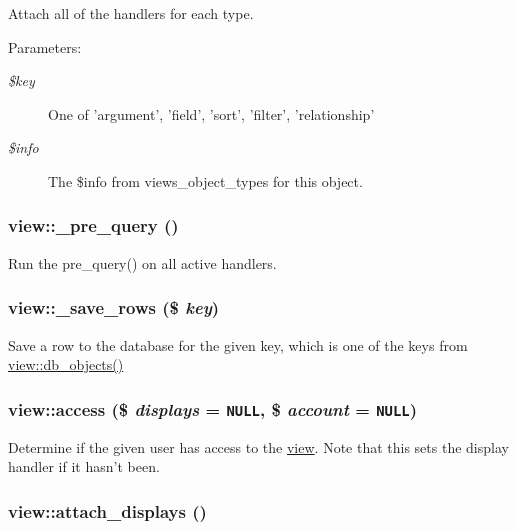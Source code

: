 Attach all of the handlers for each type.

\begin{Desc}
\item[Parameters:]
\begin{description}
\item[{\em \$key}]One of 'argument', 'field', 'sort', 'filter', 'relationship' \item[{\em \$info}]The \$info from views\_\-object\_\-types for this object. \end{description}
\end{Desc}
\hypertarget{classview_882fc1813823b4fa361748edaae121ee}{
\subsubsection[{\_\-pre\_\-query}]{\setlength{\rightskip}{0pt plus 5cm}view::\_\-pre\_\-query ()}}
\label{classview_882fc1813823b4fa361748edaae121ee}


Run the pre\_\-query() on all active handlers. \hypertarget{classview_c54578fd717de9be8c127add6e869bc2}{
\subsubsection[{\_\-save\_\-rows}]{\setlength{\rightskip}{0pt plus 5cm}view::\_\-save\_\-rows (\$ {\em key})}}
\label{classview_c54578fd717de9be8c127add6e869bc2}


Save a row to the database for the given key, which is one of the keys from \hyperlink{classview_7df52d46e3a8245e6d8f415133c31cad}{view::db\_\-objects()} \hypertarget{classview_996e7b183eb9d43ec9d535dbf897616a}{
\subsubsection[{access}]{\setlength{\rightskip}{0pt plus 5cm}view::access (\$ {\em displays} = {\tt NULL}, \/  \$ {\em account} = {\tt NULL})}}
\label{classview_996e7b183eb9d43ec9d535dbf897616a}


Determine if the given user has access to the \hyperlink{classview}{view}. Note that this sets the display handler if it hasn't been. \hypertarget{classview_39447f6a3f0456b0a2e75799c074e453}{
\subsubsection[{attach\_\-displays}]{\setlength{\rightskip}{0pt plus 5cm}view::attach\_\-displays ()}}
\label{classview_39447f6a3f0456b0a2e75799c074e453}


